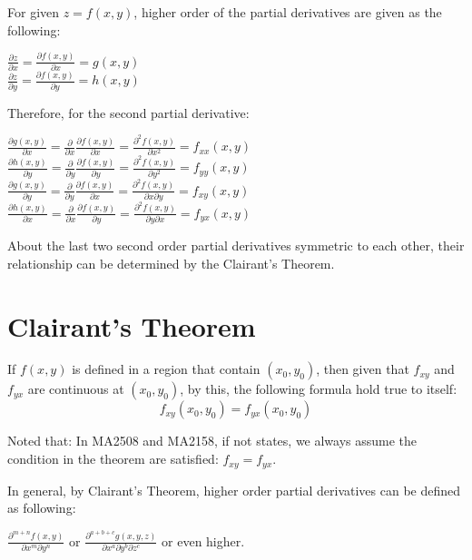 \documentclass[UTF8,a4paper, 10pt, openany]{svmono}
\begin{document}
For given $z=f(x,y)$, higher order of the partial derivatives are given as the following:

\begin{center}
$\frac{\partial z}{\partial x}=\frac{\partial f(x,y)}{\partial x}=g(x,y)$\\
$\frac{\partial z}{\partial y}=\frac{\partial f(x,y)}{\partial y}=h(x,y)$
\end{center}

Therefore, for the second partial derivative:

\begin{center}
$\frac{\partial g(x,y)}{\partial x}=\frac{\partial}{\partial x}\frac{\partial f(x,y)}{\partial x}=\frac{\partial^2 f(x,y)}{\partial x^2}=f_{xx}(x,y)$\\
$\frac{\partial h(x,y)}{\partial y}=\frac{\partial}{\partial y}\frac{\partial f(x,y)}{\partial y}=\frac{\partial^2 f(x,y)}{\partial y^2}=f_{yy}(x,y)$\\
$\frac{\partial g(x,y)}{\partial y}=\frac{\partial}{\partial y}\frac{\partial f(x,y)}{\partial x}=\frac{\partial^2 f(x,y)}{\partial x\partial y}=f_{xy}(x,y)$\\
$\frac{\partial h(x,y)}{\partial x}=\frac{\partial}{\partial x}\frac{\partial f(x,y)}{\partial y}=\frac{\partial^2 f(x,y)}{\partial y\partial x}=f_{yx}(x,y)$
\end{center}

About the last two second order partial derivatives symmetric to each other, their relationship can be determined by the Clairant's Theorem.

\section{Clairant's Theorem}
If $f(x,y)$ is defined in a region that contain $(x_0,y_0)$, then given that $f_{xy}$ and $f_{yx}$ are continuous at $(x_0,y_0)$, by this, the following formula hold true to itself:
\begin{equation}
\boxed{f_{xy}(x_0,y_0)=f_{yx}(x_0,y_0)}
\end{equation}

Noted that: In MA2508 and MA2158, if not states, we always assume the condition in the theorem are satisfied: $f_{xy}=f_{yx}$.

In general, by Clairant's Theorem, higher order partial derivatives can be defined as following:
\begin{center}
$\frac{\partial^{m+n}f(x,y)}{\partial x^m \partial y^n}$ or $\frac{\partial^{a+b+c}g(x,y,z)}{\partial x^a \partial y^b \partial z^c}$ or even higher.
\end{center}
\end{document}
